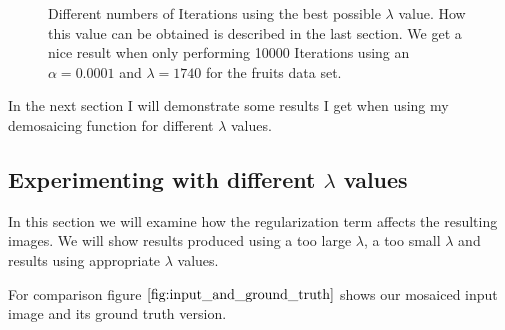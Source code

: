 \documentclass{paper}
\begin{document}
\begin{figure}[H]
\begin{center}
{   \label{fig:subfig1223}
 }
\end{center}
\caption{Different numbers of Iterations using the best possible $\lambda$ value. How this value can be obtained is described in the last section. We get a nice result when only performing 10000 Iterations using an $\alpha=0.0001$ and $\lambda = 1740$ for the fruits data set.}
\label{fig:different_iters_for_best_lambda}
\end{figure}

In the next section I will demonstrate some results I get when using my demosaicing function for different $\lambda$ values. 

\subsection{Experimenting with different $\lambda$ values}
In this section we will examine how the regularization term affects the resulting images. We will show results produced using a too large $\lambda$, a too small $\lambda$ and results using appropriate $\lambda$ values.

For comparison figure $\ref{fig:input_and_ground_truth}$ shows our mosaiced input image and its ground truth version.
\end{document}
